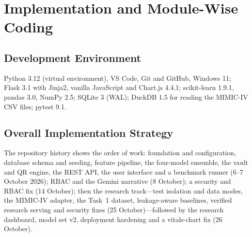 \chapter{Implementation and Module-Wise Coding}
\label{ch:impl}

\section{Development Environment}
Python 3.12 (virtual environment), VS Code, Git and GitHub, Windows 11; Flask 3.1 with Jinja2, vanilla
JavaScript and Chart.js 4.4.1; scikit-learn 1.9.1, pandas 3.0, NumPy 2.5; SQLite 3 (WAL); DuckDB 1.5 for
reading the MIMIC-IV CSV files; pytest 9.1.

\section{Overall Implementation Strategy}
The repository history shows the order of work: foundation and configuration, database schema and seeding,
feature pipeline, the four-model ensemble, the vault and QR engine, the REST API, the user interface and a
benchmark runner (6--7 October 2026); RBAC and the Gemini narrative (8 October); a security and RBAC fix
(14 October); then the research track---test isolation and data modes, the MIMIC-IV adapter, the Task~1
dataset, leakage-aware baselines, verified research serving and security fixes (25 October)---followed by
the research dashboard, model set v2, deployment hardening and a vitals-chart fix (26 October).

